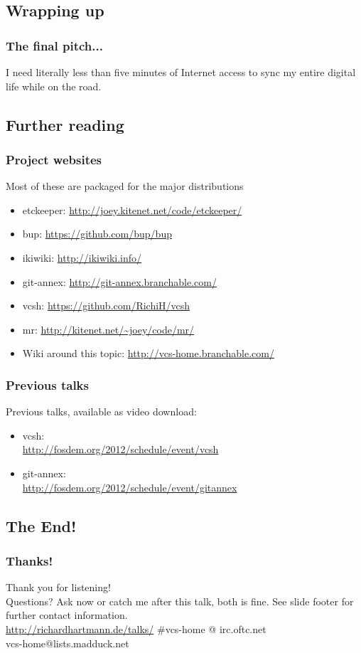 \documentclass[t]{beamer}
\begin{document}
\subsection{Wrapping up}

\begin{frame}
	\frametitle{The final pitch...}
	\vfill
	I need literally less than five minutes of Internet access to sync my entire digital life while on the road.
	\vfill
\end{frame}

\subsection{Further reading}

\begin{frame}
	\frametitle{Project websites}
	Most of these are packaged for the major distributions
	\begin{itemize}
		\item etckeeper: \url{http://joey.kitenet.net/code/etckeeper/}
		\item bup: \url{https://github.com/bup/bup}
		\item ikiwiki: \url{http://ikiwiki.info/}
		\item git-annex: \url{http://git-annex.branchable.com/}
		\item vcsh: \url{https://github.com/RichiH/vcsh}
		\item mr: \url{http://kitenet.net/~joey/code/mr/}
		\item Wiki around this topic: \url{http://vcs-home.branchable.com/}
	\end{itemize}
\end{frame}

\begin{frame}
	\frametitle{Previous talks}
	Previous talks, available as video download:
	\begin{itemize}
		\item vcsh: \\
			\url{http://fosdem.org/2012/schedule/event/vcsh}
		\item git-annex: \\
			\url{http://fosdem.org/2012/schedule/event/gitannex}
	\end{itemize}
\end{frame}

\subsection{The End!}

\begin{frame}
	\frametitle{Thanks!}
		\begin{center}
			\vfill
			Thank you for listening!\\
			\vfill
			Questions? Ask now or catch me after this talk, both is fine.
			\vfill
			See slide footer for further contact information.\\
			\vfill
			\url{http://richardhartmann.de/talks/}
			\vfill
			\#vcs-home @ irc.oftc.net\\
			vcs-home@lists.madduck.net
			\vfill
		\end{center}
\end{frame}
\end{document}
